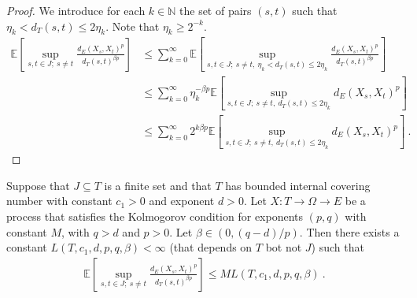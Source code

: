 \begin{proof}
We introduce for each $k \in \mathbb{N}$ the set of pairs $(s, t)$ such that $\eta_k < d_T(s, t) \le 2 \eta_k$.
Note that $\eta_k \ge 2^{-k}$.
\begin{align*}
  \mathbb{E}\left[ \sup_{s, t \in J;\: s \ne t} \frac{d_E(X_s, X_t)^p}{d_T(s, t)^{\beta p}} \right]
  &\le \sum_{k=0}^\infty \mathbb{E}\left[ \sup_{s, t \in J;\: s \ne t, \: \eta_k < d_T(s, t) \le 2 \eta_k} \frac{d_E(X_s, X_t)^p}{d_T(s, t)^{\beta p}} \right]
  \\
  &\le \sum_{k=0}^\infty \eta_k^{-\beta p} \mathbb{E}\left[ \sup_{s, t \in J;\: s \ne t, \: d_T(s, t) \le 2 \eta_k} d_E(X_s, X_t)^p \right]
  \\
  &\le \sum_{k=0}^\infty 2^{k \beta p} \mathbb{E}\left[ \sup_{s, t \in J;\: s \ne t, \: d_T(s, t) \le 2 \eta_k} d_E(X_s, X_t)^p \right]
  \: .
\end{align*}
\end{proof}


\begin{lemma}\label{lem:finite_set_bound}
  \leanok
Suppose that $J \subseteq T$ is a finite set and that $T$ has bounded internal covering number with constant $c_1>0$ and exponent $d > 0$.
Let $X : T \to \Omega \to E$ be a process that satisfies the Kolmogorov condition for exponents $(p,q)$ with constant $M$, with $q > d$ and $p > 0$.
Let $\beta \in(0, (q - d)/p)$.
Then there exists a constant $L(T, c_1, d, p, q, \beta) < \infty$ (that depends on $T$ bot not $J$) such that
\begin{align*}
  \mathbb{E}\left[ \sup_{s, t \in J;\: s \ne t} \frac{d_E(X_s, X_t)^p}{d_T(s, t)^{\beta p}} \right]
  \le M L(T, c_1, d, p, q, \beta)
  \: .
\end{align*}
\end{lemma}

